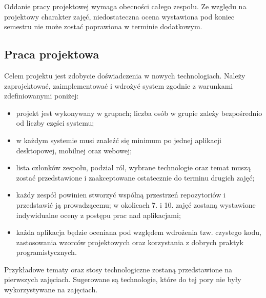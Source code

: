 \documentclass{article}
\begin{document}
	Oddanie pracy projektowej wymaga obecności całego zespołu. Ze względu na projektowy charakter zajęć, niedostateczna ocena wystawiona pod koniec semestru nie może zostać poprawiona w terminie dodatkowym.
	
	\subsection{Praca projektowa}
	Celem projektu jest zdobycie doświadczenia w nowych technologiach. Należy zaprojektować, zaimplementować i wdrożyć system zgodnie z warunkami zdefiniowanymi poniżej:
	
	\begin{itemize}
		\item projekt jest wykonywany w grupach; liczba osób w grupie zależy bezpośrednio od liczby części systemu;
		\item w każdym systemie musi znaleźć się minimum po jednej aplikacji desktopowej, mobilnej oraz webowej;
		\item lista członków zespołu, podział ról, wybrane technologie oraz temat muszą zostać przedstawione i zaakceptowane ostatecznie do terminu drugich zajęć;
		\item każdy zespół powinien stworzyć wspólną przestrzeń repozytoriów i przedstawić ją prowadzącemu; w okolicach 7. i 10. zajęć zostaną wystawione indywidualne oceny z postępu prac nad aplikacjami;
		\item każda aplikacja będzie oceniana pod względem wdrożenia tzw. czystego kodu, zastosowania wzorców projektowych oraz korzystania z dobrych praktyk programistycznych.
	\end{itemize}
	
	Przykładowe tematy oraz stosy technologiczne zostaną przedstawione na pierwszych zajęciach. Sugerowane są technologie, które do tej pory nie były wykorzystywane na zajęciach.
	
\end{document}
